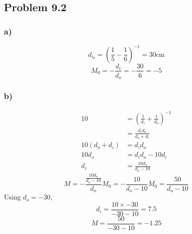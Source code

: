 \documentclass[../homework.tex]{subfiles}
\begin{document}
\subsection{Problem 9.2}
\subsubsection*{a)}
\begin{equation*}
    d_{i_0} = \left(\frac{1}{5} - \frac{1}{6}\right)^{-1} = 30\text{cm}
\end{equation*}
\begin{equation*}
    M_0 = -\frac{d_i}{d_o} = -\frac{30}{6} = -5
\end{equation*}

\subsubsection*{b)}
\begin{align*}
    10 &= \left(\frac{1}{d_i} + \frac{1}{d_o} \right)^{-1}\\
                 &= \frac{d_i d_o}{d_o + d_i} \\
    10(d_o + d_i) &= d_i d_o \\
    10 d_o &= d_i d_o - 10 d_i \\
    d_i &= \frac{10d_o}{d_o - 10}
\end{align*}
\begin{equation*}
    M = -\frac{\frac{10 d_o}{d_o - 10}}{d_o} M_0 = -\frac{10}{d_o - 10} M_0 = \frac{50}{d_o - 10}
\end{equation*}
Using $d_o = -30$,
\begin{equation*}
    d_i = \frac{10 \times -30}{-30 - 10} = 7.5
\end{equation*}
\begin{equation*}
    M = \frac{50}{-30 - 10} = -1.25
\end{equation*}
\end{document}
